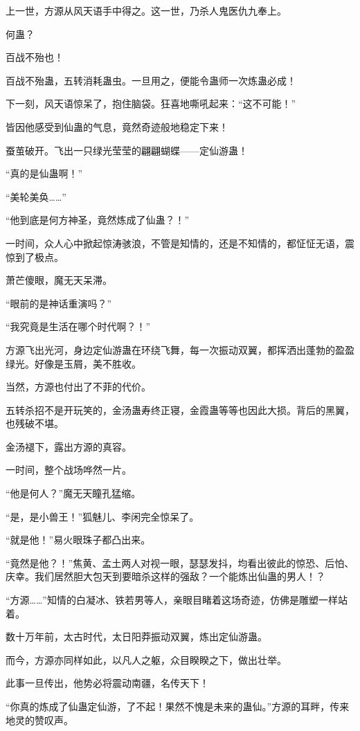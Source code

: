 \begin{this_body}
上一世，方源从风天语手中得之。这一世，乃杀人鬼医仇九奉上。

何蛊？

百战不殆也！

百战不殆蛊，五转消耗蛊虫。一旦用之，便能令蛊师一次炼蛊必成！

下一刻，风天语惊呆了，抱住脑袋。狂喜地嘶吼起来：“这不可能！”

皆因他感受到仙蛊的气息，竟然奇迹般地稳定下来！

蚕茧破开。飞出一只绿光莹莹的翩翩蝴蝶——定仙游蛊！

“真的是仙蛊啊！”

“美轮美奂……”

“他到底是何方神圣，竟然炼成了仙蛊？！”

一时间，众人心中掀起惊涛骇浪，不管是知情的，还是不知情的，都怔怔无语，震惊到了极点。

萧芒傻眼，魔无天呆滞。

“眼前的是神话重演吗？”

“我究竟是生活在哪个时代啊？！”

方源飞出光河，身边定仙游蛊在环绕飞舞，每一次振动双翼，都挥洒出蓬勃的盈盈绿光。好像是玉屑，美不胜收。

当然，方源也付出了不菲的代价。

五转杀招不是开玩笑的，金汤蛊寿终正寝，金霞蛊等等也因此大损。背后的黑翼，也残破不堪。

金汤褪下，露出方源的真容。

一时间，整个战场哗然一片。

“他是何人？”魔无天瞳孔猛缩。

“是，是小兽王！”狐魅儿、李闲完全惊呆了。

“就是他！”易火眼珠子都凸出来。

“竟然是他？！”焦黄、孟土两人对视一眼，瑟瑟发抖，均看出彼此的惊恐、后怕、庆幸。我们居然胆大包天到要暗杀这样的强敌？一个能炼出仙蛊的男人！？

“方源……”知情的白凝冰、铁若男等人，亲眼目睹着这场奇迹，仿佛是雕塑一样站着。

数十万年前，太古时代，太日阳莽振动双翼，炼出定仙游蛊。

而今，方源亦同样如此，以凡人之躯，众目睽睽之下，做出壮举。

此事一旦传出，他势必将震动南疆，名传天下！

“你真的炼成了仙蛊定仙游，了不起！果然不愧是未来的蛊仙。”方源的耳畔，传来地灵的赞叹声。


\end{this_body}
